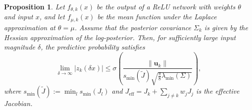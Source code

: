 \documentclass{article}
\newtheorem{proposition}{Proposition}
\begin{document}
\begin{proposition}
Let \( f_{\theta,k}(x) \) be the output of a ReLU network with weights \( \theta \) and input \( x \), and let \( f_{\mu,k}(x) \) be the mean function under the Laplace approximation at \( \theta = \mu \). Assume that the posterior covariance \( \Sigma_k \) is given by the Hessian approximation of the log-posterior. Then, for sufficiently large input magnitude \( \delta \), the predictive probability satisfies
\begin{equation}
    \lim_{\delta\to \infty} \lvert z_k(\delta x)\rvert \leq 
    \sigma \left(\frac{\lVert\mathbf{u}_k\rVert}{s_{\min}(\tilde{J})\sqrt{\frac{\pi}{8}\lambda_{\min}(\Sigma)}}\right),
\end{equation}
where \( s_{\min}(\tilde{J}) := \min_{l} s_{\min}(J_{l}) \) and \( J_{\text{eff}} = J_k + \sum_{j \neq k} w_j J_j \) is the effective Jacobian.
\end{proposition}
\end{document}
